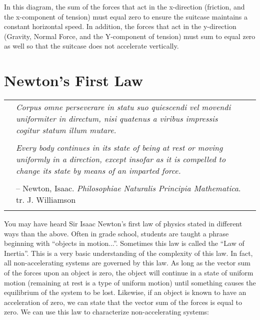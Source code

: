 \begin{mdframed}[backgroundcolor=blue!10!white]
\begin{center}
		
		
		
	\end{center}
	
	In this diagram, the sum of the forces that act in the x-direction (friction, and the x-component of tension) must equal zero to ensure the suitcase maintains a constant horizontal speed.  In addition, the forces that act in the y-direction (Gravity, Normal Force, and the Y-component of tension) must sum to equal zero as well so that the suitcase does not accelerate vertically.  
	
\end{mdframed}	


\newpage
	\section{Newton's First Law}  
	\begin{tabular}{p{.75in} p{4.5in} p{.75in}}
		 & \textit{Corpus omne perseverare in statu suo quiescendi vel movendi uniformiter in directum, nisi quatenus a viribus impressis cogitur statum illum mutare.} &  \\
		  & & \\
		 & \textit{Every body continues in its state of being at rest or moving uniformly in a direction, except insofar as it is compelled to change its state by means of an imparted force. } & \\
		 & & \\

		&  -- Newton, Isaac.  \textit{Philosophiae Naturalis Principia Mathematica}.  tr. J. Williamson & \\
		& & \\
	\end{tabular}

	

	
  You may have heard Sir Isaac Newton's first law of physics stated in different ways than the above.  Often in grade school, students are taught a phrase beginning with ``objects in motion...''.  	Sometimes this law is called the ``Law of Inertia''.   This is a very basic understanding of the complexity of this law.  In fact, all non-accelerating systems are governed by this law.  As long as the vector sum of the forces upon an object is zero, the object will continue in a state of uniform motion (remaining at rest is a type of uniform motion) until something causes the equilibrium of the system to be lost.  
	Likewise, if an object is known to have an acceleration of zero, we can state that the vector sum of the forces is equal to zero.  We can use this law to characterize non-accelerating systems:
	
